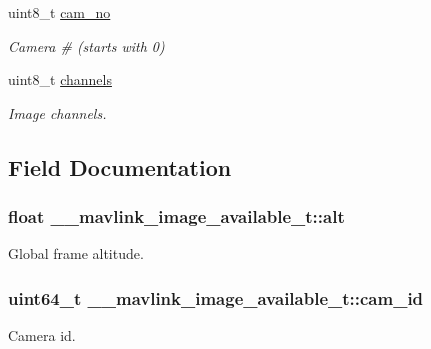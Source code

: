 \begin{DoxyCompactItemize}
uint8\+\_\+t \hyperlink{struct____mavlink__image__available__t_a31888b3bcf6b8abb286795bf9c94313e}{cam\+\_\+no}
\begin{DoxyCompactList}\small\item\em Camera \# (starts with 0) \end{DoxyCompactList}\item 
uint8\+\_\+t \hyperlink{struct____mavlink__image__available__t_a0cea54d6d8cde7411cbd8e1deb729873}{channels}
\begin{DoxyCompactList}\small\item\em Image channels. \end{DoxyCompactList}\end{DoxyCompactItemize}


\subsection{Field Documentation}
\hypertarget{struct____mavlink__image__available__t_a02d7a1fd93825b80d12c4a6188f8a486}{
\subsubsection[{alt}]{\setlength{\rightskip}{0pt plus 5cm}float \+\_\+\+\_\+mavlink\+\_\+image\+\_\+available\+\_\+t\+::alt}}\label{struct____mavlink__image__available__t_a02d7a1fd93825b80d12c4a6188f8a486}


Global frame altitude. 

\hypertarget{struct____mavlink__image__available__t_adb12c07627b04d6babbbbe9af879adc5}{
\subsubsection[{cam\+\_\+id}]{\setlength{\rightskip}{0pt plus 5cm}uint64\+\_\+t \+\_\+\+\_\+mavlink\+\_\+image\+\_\+available\+\_\+t\+::cam\+\_\+id}}\label{struct____mavlink__image__available__t_adb12c07627b04d6babbbbe9af879adc5}


Camera id. 

